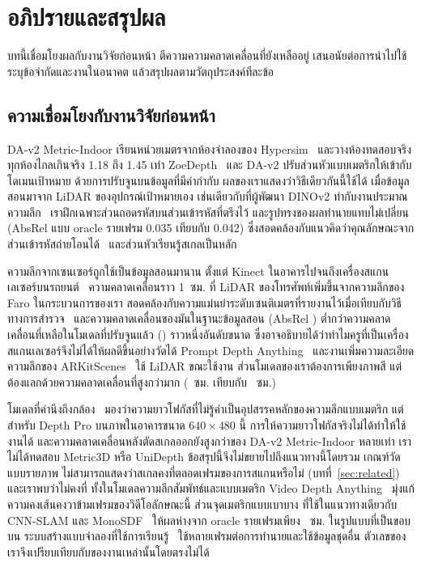 \section{อภิปรายและสรุปผล}\label{sec:discussion}

บทนี้เชื่อมโยงผลกับงานวิจัยก่อนหน้า ตีความความคลาดเคลื่อนที่ยังเหลืออยู่ เสนอนัยต่อการนำไปใช้
ระบุข้อจำกัดและงานในอนาคต แล้วสรุปผลตามวัตถุประสงค์ทีละข้อ

\subsection{ความเชื่อมโยงกับงานวิจัยก่อนหน้า}\label{sec:prior}
\mbox{DA-v2} Metric-Indoor เรียนหน่วยเมตรจากห้องจำลองของ Hypersim~\cite{da2,hypersim}
และวางห้องทดสอบจริงทุกห้องไกลเกินจริง 1.18 ถึง 1.45 เท่า ZoeDepth~\cite{zoedepth} และ \mbox{DA-v2}
ปรับส่วนหัวแบบเมตริกให้เข้ากับโดเมนเป้าหมาย ด้วยการปรับจูนบนข้อมูลที่มีค่ากำกับ
ผลของเราแสดงว่าวิธีเดียวกันนี้ใช้ได้ เมื่อข้อมูลสอนมาจาก LiDAR ของอุปกรณ์เป้าหมายเอง
เช่นเดียวกับที่ผู้พัฒนา DINOv2 ทำกับงานประมาณความลึก~\cite{dinov2} เราฝึกเฉพาะส่วนถอดรหัสบนส่วนเข้ารหัสที่ตรึงไว้
และรูปทรงของผลทำนายแทบไม่เปลี่ยน (AbsRel แบบ oracle รายเฟรม 0.035 เทียบกับ 0.042)
ซึ่งสอดคล้องกับแนวคิดว่าคุณลักษณะจากส่วนเข้ารหัสถ่ายโอนได้~\cite{yosinski} และส่วนหัวเรียนรู้สเกลเป็นหลัก

ความลึกจากเซนเซอร์ถูกใช้เป็นข้อมูลสอนมานาน ตั้งแต่ Kinect ในอาคารไปจนถึงเครื่องสแกนเลเซอร์บนรถยนต์~\cite{nyuv2,kitti,eigen14}
ความคลาดเคลื่อนราว 1~ซม. ที่ LiDAR ของโทรศัพท์เพิ่มขึ้นจากความลึกของ Faro ในกระบวนการของเรา
สอดคล้องกับความแม่นยำระดับเซนติเมตรที่รายงานไว้เมื่อเทียบกับวิธีทางการสำรวจ~\cite{luetzenburg,spreafico}
และความคลาดเคลื่อนของมันในฐานะข้อมูลสอน (AbsRel \rsLIDARABSREL{}) ต่ำกว่าความคลาดเคลื่อนที่เหลือในโมเดลที่ปรับจูนแล้ว
(\rsFTLIDARALLABSREL{}) ราวหนึ่งอันดับขนาด ซึ่งอาจอธิบายได้ว่าทำไมครูที่เป็นเครื่องสแกนเลเซอร์จึงไม่ได้ให้ผลดีขึ้นอย่างวัดได้
Prompt Depth Anything~\cite{promptda} และงานเพิ่มความละเอียดความลึกของ ARKitScenes~\cite{arkitscenes}
ใช้ LiDAR ขณะใช้งาน ส่วนโมเดลของเราต้องการเพียงภาพสี แต่ต้องแลกด้วยความคลาดเคลื่อนที่สูงกว่ามาก
(\rsFTLIDARALLCM{}~ซม. เทียบกับ \rsLIDARCM{}~ซม.)

โมเดลที่คำนึงถึงกล้อง~\cite{metric3d,unidepth,depthpro} มองว่าความยาวโฟกัสที่ไม่รู้ค่าเป็นอุปสรรคหลักของความลึกแบบเมตริก
แต่สำหรับ Depth Pro บนภาพในอาคารขนาด $640\times480$ นี้ การให้ความยาวโฟกัสจริงไม่ได้ทำให้ใช้งานได้
และความคลาดเคลื่อนหลังตัดสเกลออกยังสูงกว่าของ \mbox{DA-v2} Metric-Indoor หลายเท่า
เราไม่ได้ทดสอบ Metric3D หรือ UniDepth ข้อสรุปนี้จึงไม่ขยายไปถึงแนวทางนี้โดยรวม
เกณฑ์วัดแบบรายภาพ ไม่สามารถแสดงว่าสเกลคงที่ตลอดเฟรมของการสแกนหรือไม่ (บทที่~\ref{sec:related})
และเราพบว่าไม่คงที่ ทั้งในโมเดลความลึกสัมพัทธ์และแบบเมตริก Video Depth Anything~\cite{videoda}
มุ่งแก้ความคงเส้นคงวาข้ามเฟรมของวิดีโอลักษณะนี้ ส่วนจุดเมตริกแบบเบาบาง ที่ใช้ในแนวทางเดียวกับ CNN-SLAM และ MonoSDF~\cite{cnnslam,monosdf}
ให้ผลห่างจาก oracle รายเฟรมเพียง \rsSPARSEGAP{}~ซม. ในรูปแบบที่เป็นขอบบน
ระบบสร้างแบบจำลองที่ใช้การเรียนรู้~\cite{atlas,neuralrecon,simplerecon} ใช้หลายเฟรมต่อการทำนายและใช้ข้อมูลชุดอื่น
ตัวเลขของเราจึงเปรียบเทียบกับของงานเหล่านั้นโดยตรงไม่ได้

